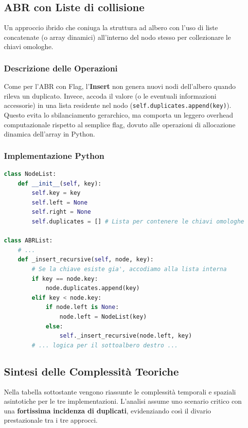 \documentclass[11pt,a4paper]{article}
\begin{document}
\subsection{ABR con Liste di collisione}

Un approccio ibrido che coniuga la struttura ad albero con l'uso di liste concatenate (o array dinamici) all'interno del nodo stesso per collezionare le chiavi omologhe.

\subsubsection{Descrizione delle Operazioni}
Come per l'ABR con Flag, l'\textbf{Insert} non genera nuovi nodi dell'albero quando rileva un duplicato. Invece, accoda il valore (o le eventuali informazioni accessorie) in una lista residente nel nodo (\texttt{self.duplicates.append(key)}). Questo evita lo sbilanciamento gerarchico, ma comporta un leggero overhead computazionale rispetto al semplice flag, dovuto alle operazioni di allocazione dinamica dell'array in Python.

\subsubsection{Implementazione Python}
\begin{lstlisting}[language=Python]
class NodeList:
    def __init__(self, key):
        self.key = key
        self.left = None
        self.right = None
        self.duplicates = [] # Lista per contenere le chiavi omologhe

class ABRList:
    # ...
    def _insert_recursive(self, node, key):
        # Se la chiave esiste gia', accodiamo alla lista interna
        if key == node.key:
            node.duplicates.append(key)
        elif key < node.key:
            if node.left is None:
                node.left = NodeList(key)
            else:
                self._insert_recursive(node.left, key)
        # ... logica per il sottoalbero destro ...
\end{lstlisting}

\subsection{Sintesi delle Complessità Teoriche}

Nella tabella sottostante vengono riassunte le complessità temporali e spaziali asintotiche per le tre implementazioni. L'analisi assume uno scenario critico con una \textbf{fortissima incidenza di duplicati}, evidenziando così il divario prestazionale tra i tre approcci. 
\end{document}
